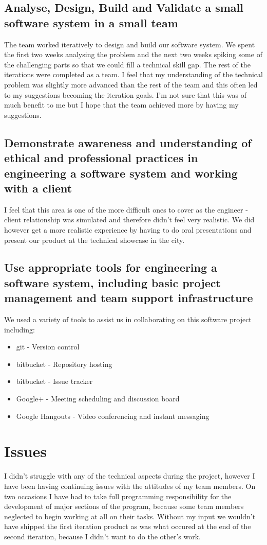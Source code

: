 \documentclass{article}
\begin{document}
\subsection{Analyse, Design, Build and Validate a small software system in a small team}
The team worked iteratively to design and build our software system. We spent the first two weeks analysing the problem and the next two weeks spiking some of the challenging parts so that we could fill a technical skill gap. The rest of the iterations were completed as a team. I feel that my understanding of the technical problem was slightly more advanced than the rest of the team and this often led to my suggestions becoming the iteration goals. I'm not sure that this was of much benefit to me but I hope that the team achieved more by having my suggestions.

\subsection{Demonstrate awareness and understanding of ethical and professional practices in engineering a software system and working with a client}
I feel that this area is one of the more difficult ones to cover as the engineer - client relationship was simulated and therefore didn't feel very realistic. We did however get a more realistic experience by having to do oral presentations and present our product at the technical showcase in the city.

\subsection{Use appropriate tools for engineering a software system, including basic project management and team support infrastructure}
We used a variety of tools to assist us in collaborating on this software project including:
\begin{itemize}
	\item{git - Version control}
	\item{bitbucket - Repository hosting}
	\item{bitbucket - Issue tracker}
	\item{Google+ - Meeting scheduling and discussion board}
	\item{Google Hangouts - Video conferencing and instant messaging}
\end{itemize}

\section{Issues}
I didn't struggle with any of the technical aspects during the project, however I have been having continuing issues with the attitudes of my team members. On two occasions I have had to take full programming responsibility for the development of major sections of the program, because some team members neglected to begin working at all on their tasks. Without my input we wouldn't have shipped the first iteration product as was what occured at the end of the second iteration, because I didn't want to do the other's work. 
\end{document}
